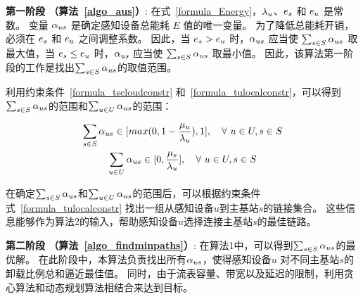 \textbf{第一阶段 （算法~\ref{algo_aus}）}:
在式~\eqref{formula_Energy}，${\lambda}_{u}$、$e_s$ 和 $e_u$ 是常数。
变量 ${\alpha}_{us}$ 是确定感知设备总能耗 $E$ 值的唯一变量。
为了降低总能耗开销，必须在 $e_s$ 和 $e_u$ 之间调整系数。
因此，当 $e_s > e_u$ 时，${\alpha}_{us}$ 应当使 $\sum_{s \in S}{{\alpha}_{us}}$ 取最大值，当 $e_s \leq e_u$ 时，${\alpha}_{us}$ 应当使 $\sum_{s \in S}{{\alpha}_{us}}$ 取最小值。
因此，该算法第一阶段的工作是找出$\sum_{s \in S}{\alpha}_{us}$的取值范围。

利用约束条件~\eqref{formula_tscloudconstr} 和~\eqref{formula_tulocalconstr}，可以得到$\sum_{s \in S}{\alpha}_{us}$的范围和$\sum_{u \in U}{\alpha}_{us}$的范围：

\vspace{-1em}

\begin{equation*}
\begin{gathered}
\sum_{s \in S}{\alpha}_{us} \in [max(0, 1- \frac{{\mu}_{u}}{{\lambda}_{u}}), 1], \quad \forall\ u \in U, s \in S\\
\sum_{u \in U}{\alpha}_{us} \in [0, \frac{{\mu}_{s}}{{\lambda}_{u}}], \quad \forall\ u \in U, s \in S
\end{gathered}
\end{equation*}

在确定$\sum_{s \in S}{\alpha}_{us}$和$\sum_{u \in U}{\alpha}_{us}$的范围后，可以根据约束条件式~\eqref{formula_tulocalconstr} 找出一组从感知设备$u$到主基站$s$的链接集合。
这些信息能够作为算法2的输入，帮助感知设备$u$选择连接主基站$s$的最佳链路。



\textbf{第二阶段 （算法~\ref{algo_findminpaths}）}:
在算法1中，可以得到$\sum_{s \in S}{\alpha}_{us}$的最优解。
在此阶段中，本算法负责找出所有${\alpha}_{us}$，使得感知设备$u$ 对不同主基站$s$的卸载比例总和逼近最佳值。
同时，由于流表容量、带宽以及延迟的限制，利用贪心算法和动态规划算法相结合来达到目标。

